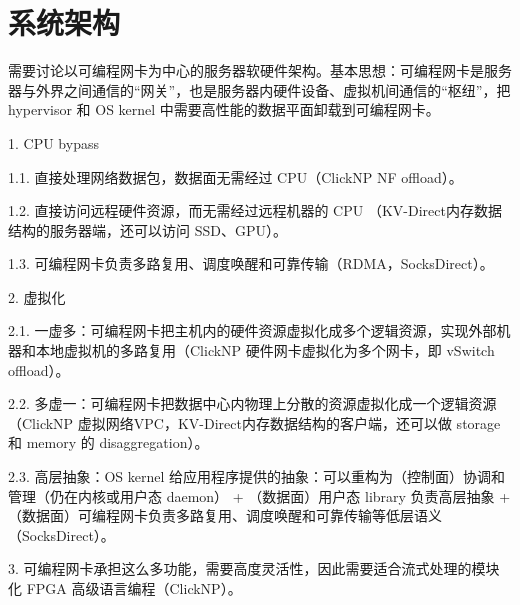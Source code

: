 \chapter{系统架构}

需要讨论以可编程网卡为中心的服务器软硬件架构。基本思想：可编程网卡是服务器与外界之间通信的“网关”，也是服务器内硬件设备、虚拟机间通信的“枢纽”，把 hypervisor 和 OS kernel 中需要高性能的数据平面卸载到可编程网卡。

1. CPU bypass

1.1. 直接处理网络数据包，数据面无需经过 CPU（ClickNP NF offload）。

1.2. 直接访问远程硬件资源，而无需经过远程机器的 CPU （KV-Direct内存数据结构的服务器端，还可以访问 SSD、GPU）。

1.3. 可编程网卡负责多路复用、调度唤醒和可靠传输（RDMA，SocksDirect）。

2. 虚拟化

2.1. 一虚多：可编程网卡把主机内的硬件资源虚拟化成多个逻辑资源，实现外部机器和本地虚拟机的多路复用（ClickNP 硬件网卡虚拟化为多个网卡，即 vSwitch offload）。

2.2. 多虚一：可编程网卡把数据中心内物理上分散的资源虚拟化成一个逻辑资源（ClickNP 虚拟网络VPC，KV-Direct内存数据结构的客户端，还可以做 storage 和 memory 的 disaggregation）。

2.3. 高层抽象：OS kernel 给应用程序提供的抽象：可以重构为（控制面）协调和管理（仍在内核或用户态 daemon） + （数据面）用户态 library 负责高层抽象 + （数据面）可编程网卡负责多路复用、调度唤醒和可靠传输等低层语义（SocksDirect）。

3. 可编程网卡承担这么多功能，需要高度灵活性，因此需要适合流式处理的模块化 FPGA 高级语言编程（ClickNP）。